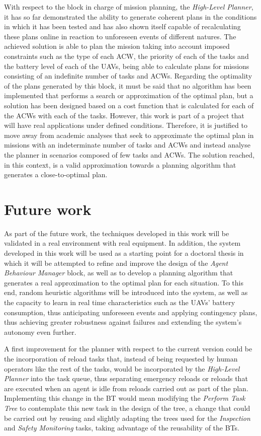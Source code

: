 With respect to the block in charge of mission planning, the \emph{High-Level Planner}, it has so far demonstrated the ability to generate coherent plans in the conditions in which it has been tested and has also shown itself capable of recalculating these plans online in reaction to unforeseen events of different natures. The achieved solution is able to plan the mission taking into account imposed constraints such as the type of each \gls{ACW}, the priority of each of the tasks and the battery level of each of the \glspl{UAV}, being able to calculate plans for missions consisting of an indefinite number of tasks and \glspl{ACW}. Regarding the optimality of the plans generated by this block, it must be said that no algorithm has been implemented that performs a search or approximation of the optimal plan, but a solution has been designed based on a cost function that is calculated for each of the \glspl{ACW} with each of the tasks. However, this work is part of a project that will have real applications under defined conditions. Therefore, it is justified to move away from academic analyses that seek to approximate the optimal plan in missions with an indeterminate number of tasks and \glspl{ACW} and instead analyse the planner in scenarios composed of few tasks and \glspl{ACW}. The solution reached, in this context, is a valid approximation towards a planning algorithm that generates a close-to-optimal plan.

\section{Future work}
\label{sec:FutureWork}
As part of the future work, the techniques developed in this work will be validated in a real environment with real equipment. In addition, the system developed in this work will be used as a starting point for a doctoral thesis in which it will be attempted to refine and improve the design of the \emph{Agent Behaviour Manager} block, as well as to develop a planning algorithm that generates a real approximation to the optimal plan for each situation. To this end, random heuristic algorithms will be introduced into the system, as well as the capacity to learn in real time characteristics such as the \glspl{UAV}' battery consumption, thus anticipating unforeseen events and applying contingency plans, thus achieving greater robustness against failures and extending the system's autonomy even further.

A first improvement for the planner with respect to the current version could be the incorporation of reload tasks that, instead of being requested by human operators like the rest of the tasks, would be incorporated by the \emph{High-Level Planner} into the task queue, thus separating emergency reloads or reloads that are executed when an agent is idle from reloads carried out as part of the plan. Implementing this change in the \gls{BT} would mean modifying the \emph{Perform Task Tree} to contemplate this new task in the design of the tree, a change that could be carried out by reusing and slightly adapting the trees used for the \emph{Inspection} and \emph{Safety Monitoring} tasks, taking advantage of the reusability of the \glspl{BT}.

